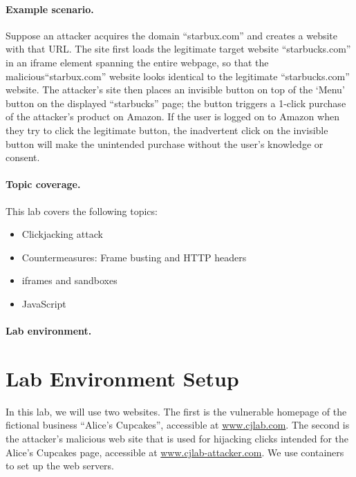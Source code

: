 \paragraph{Example scenario.} Suppose an attacker acquires the domain
``starbux.com'' and creates a website with that URL. The site first
loads the legitimate target website ``starbucks.com'' in an iframe
element spanning the entire webpage, so that the
malicious``starbux.com'' website looks identical to the legitimate
``starbucks.com'' website.  The attacker's site then places an invisible
button on top of the `Menu' button on the displayed ``starbucks'' page;
the button triggers a 1-click purchase of the attacker's product on
Amazon.  If the user is logged on to Amazon when they try to click the
legitimate button, the inadvertent click on the invisible button will
make the unintended purchase without the user's knowledge or consent.

\paragraph{Topic coverage.} This lab covers the following topics:
\begin{itemize}[noitemsep]
 \item Clickjacking attack
 \item Countermeasures: Frame busting and HTTP headers
 \item iframes and sandboxes
 \item JavaScript
\end{itemize}

\paragraph{Lab environment.}
\seedenvironmentB
\nodependency



\section{Lab Environment Setup}

In this lab, we will use two websites.  The first is the vulnerable
homepage of the fictional business ``Alice's Cupcakes'', accessible at
\url{www.cjlab.com}.  The second is the attacker's malicious web site
that is used for hijacking clicks intended for the Alice's Cupcakes
page, accessible at \url{www.cjlab-attacker.com}. We
use containers to set up the web servers.
 
